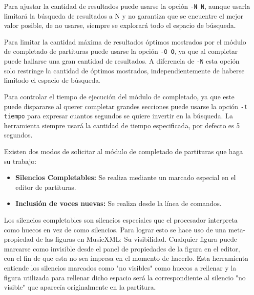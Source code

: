 Para ajustar la cantidad de resultados puede usarse la opción \texttt{-N N}, aunque usarla limitará la búsqueda de resultados a N y no garantiza que se encuentre el mejor valor posible, de no usarse, siempre se explorará todo el espacio de búsqueda.

Para limitar la cantidad máxima de resultados óptimos mostrados por el módulo de completado de partituras puede usarse la opción \texttt{-O O}, ya que al completar puede hallarse una gran cantidad de resultados. A diferencia de \texttt{-N} esta opción solo restringe la cantidad de óptimos mostrados, independientemente de haberse limitado el espacio de búsqueda.

Para controlar el tiempo de ejecución del módulo de completado, ya que este puede dispararse al querer completar grandes secciones puede usarse la opción \texttt{-t tiempo} para expresar cuantos segundos se quiere invertir en la búsqueda. La herramienta siempre usará la cantidad de tiempo especificada, por defecto es 5 segundos.

Existen dos modos de solicitar al módulo de completado de partituras que haga su trabajo:
\begin{itemize}
	\item \textbf{Silencios Completables:} Se realiza mediante un marcado especial en el editor de partituras.
	\item \textbf{Inclusión de voces nuevas:} Se realiza desde la línea de comandos.
\end{itemize}

Los silencios completables son silencios especiales que el procesador interpreta como huecos en vez de como silencios. Para lograr esto se hace uso de una meta-propiedad de las figuras en MusicXML: Su visibilidad. Cualquier figura puede marcarse como invisible desde el panel de propiedades de la figura en el editor, con el fin de que esta no sea impresa en el momento de hacerlo. Esta herramienta entiende los silencios marcados como "no visibles" como huecos a rellenar y la figura utilizada para rellenar dicho espacio será la correspondiente al silencio "no visible" que aparecía originalmente en la partitura.

